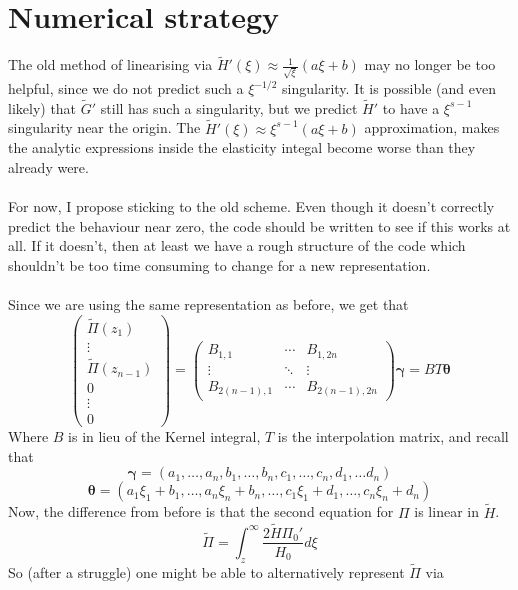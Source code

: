 \documentclass{article}
\newcommand{\bs}{\boldsymbol}                               %
\begin{document}
\section{Numerical strategy}
The old method of linearising via $\tilde{H}'(\xi) \approx 
\frac{1}{\sqrt{\xi}}(a\xi+b)$ may no longer be too helpful, since we do not 
predict such a $\xi^{-1/2}$ singularity. It is possible (and even likely) 
that $\tilde{G}'$ still has such a singularity, but we predict $\tilde{H}'$ 
to have a $\xi^{s-1}$ singularity near the origin. The 
$\tilde{H}'(\xi) \approx \xi^{s-1}(a\xi+b)$ 
approximation, makes the analytic expressions inside the elasticity integal 
become worse than they already were.
\\
\\
For now, I propose sticking to the old scheme. Even though it doesn't correctly
predict the behaviour near zero, the code should be written to see if this works
at all. If it doesn't, then at least we have a rough structure of the code
which shouldn't be too time consuming to change for a new representation.
\\
\\
Since we are using the same representation as before, we get that 
\[ \left( \begin{array}{c} \tilde{\Pi}(z_1) \\ \vdots \\ \tilde{\Pi}(z_{n-1}) 
\\[4pt] 0 \\ \vdots \\ 0 \end{array} \right) =
\left( \begin{array}{ccc} B_{1,1} & \cdots & B_{1 , 2n} \\
\vdots & \ddots & \vdots \\ B_{2(n-1),1} & \cdots & B_{2(n-1) , 2n} 
\end{array}
\right) \bs{\gamma} = BT\bs{\theta} \]
Where $B$ is in lieu of the Kernel integral, $T$ is the interpolation matrix,
and recall that 
\[ \bs{\gamma} = (a_1, \dots, a_n, b_1, \dots , b_n, c_1, \dots, c_n, d_1, \dots 
 d_n) \]
\[ \bs{\theta} = (a_1\xi_1+b_1, \dots, a_n\xi_n+b_n,\dots , c_1\xi_1+d_1, \dots,
 c_n \xi_n +  d_n) \]
Now, the difference from before is that the second equation for $\Pi$ is linear
in $\tilde{H}$. 
\[ \tilde{\Pi} = \int_z^{\infty} \frac{2 \tilde{H} \Pi_0'}{H_0} d\xi \]
So (after a struggle) one might be able to alternatively represent 
$\tilde{\Pi}$ via 
\end{document}
